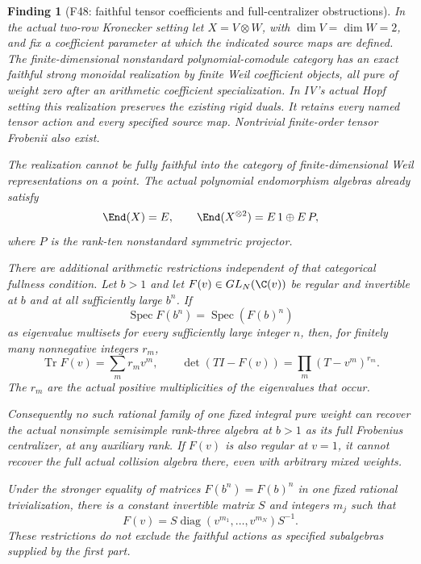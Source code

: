 \documentclass[11pt,a4paper]{article}
\newcommand{\fid}[1]{\textsf{#1}}\newcommand{\gate}[1]{\textsf{#1}}
\theoremstyle{named}\newtheorem{finding}{Finding}[section]
\theoremstyle{definition}\newtheorem{definition}[finding]{Definition}
\theoremstyle{remark}\newtheorem{remark}[finding]{Remark}
\begin{document}
\begin{finding}[\fid{F48}: faithful tensor coefficients and full-centralizer obstructions]\label{f:tensorweilgate}
In the actual two-row Kronecker setting let $X=V\otimes W$,
with $\dim V=\dim W=2$, and fix a coefficient parameter at which
the indicated source maps are defined.
The finite-dimensional nonstandard polynomial-comodule category
has an exact faithful strong monoidal realization by finite
Weil coefficient objects, all pure of weight zero after an
arithmetic coefficient specialization. In IV's actual Hopf
setting this realization preserves the existing rigid duals.
It retains every named tensor action and every specified
source map. Nontrivial finite-order tensor Frobenii also exist.

The realization cannot be fully faithful into the category of
finite-dimensional Weil representations on a point.
The actual polynomial endomorphism algebras already satisfy
\[
 \End(X)=E,\qquad
 \End(X^{\otimes2})=E\,1\oplus E\,P,
\]
where $P$ is the rank-ten nonstandard symmetric projector.

There are additional arithmetic restrictions independent of
that categorical fullness condition. Let $b>1$ and let
$F(v)\in GL_N(\C(v))$ be regular and invertible at $b$ and
at all sufficiently large $b^n$. If
\begin{equation}\label{eq:tensorweilspectral}
 \operatorname{Spec}F(b^n)
   =\operatorname{Spec}(F(b)^n)
\end{equation}
as eigenvalue multisets for every sufficiently large integer $n$,
then, for finitely many nonnegative integers $r_m$,
\[
 \operatorname{Tr}F(v)=\sum_m r_m v^m,\qquad
 \det(TI-F(v))=\prod_m(T-v^m)^{r_m}.
\]
The $r_m$ are the actual positive multiplicities of the
eigenvalues that occur.

Consequently no such rational family of one fixed integral
pure weight can recover the actual nonsimple semisimple
rank-three algebra at $b>1$ as its full Frobenius centralizer,
at any auxiliary rank. If $F(v)$ is also regular at $v=1$,
it cannot recover the full actual collision algebra there,
even with arbitrary mixed weights.

Under the stronger equality of matrices
$F(b^n)=F(b)^n$ in one fixed rational trivialization,
there is a constant invertible matrix $S$ and integers $m_j$
such that
\[
 F(v)=S\operatorname{diag}(v^{m_1},\ldots,v^{m_N})S^{-1}.
\]
These restrictions do not exclude the faithful actions as
specified subalgebras supplied by the first part.
\end{finding}
\end{document}
